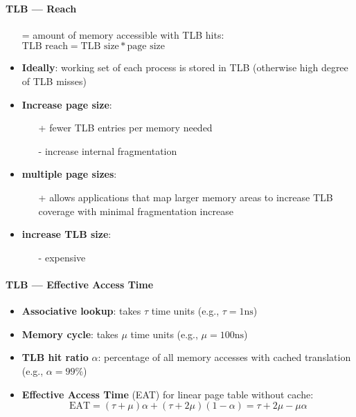 \paragraph{TLB --- Reach}
\begin{itemize}
  \item[=] amount of memory accessible with TLB hits: $ \text{TLB reach} = \text{TLB size} * \text{page size} $
  \item \textbf{Ideally}: working set of each process is stored in TLB (otherwise high degree of TLB misses)
  \item \textbf{Increase page size}:
  \begin{itemize}
    \item[+] fewer TLB entries per memory needed
    \item[-] increase internal fragmentation
  \end{itemize}
  \item \textbf{multiple page sizes}:
  \begin{itemize}
    \item[+] allows applications that map larger memory areas to increase TLB coverage with minimal fragmentation increase
  \end{itemize}
  \item \textbf{increase TLB size}:
  \begin{itemize}
    \item[-] expensive
  \end{itemize}
\end{itemize}

\paragraph{TLB --- Effective Access Time}
\begin{itemize}
  \item \textbf{Associative lookup}: takes $ \tau $ time units (e.g., $ \tau = 1\text{ns} $)
  \item \textbf{Memory cycle}: takes $ \mu $ time units (e.g., $ \mu = 100\text{ns} $)
  \item \textbf{TLB hit ratio} $ \alpha $: percentage of all memory accesses with cached translation (e.g., $ \alpha = 99\% $)
  \item \textbf{Effective Access Time} (EAT) for linear page table without cache:
    \begin{equation*}
      \text{EAT} = (\tau + \mu)\alpha + (\tau + 2\mu)(1-\alpha) = \tau + 2\mu - \mu\alpha
    \end{equation*}
\end{itemize}

